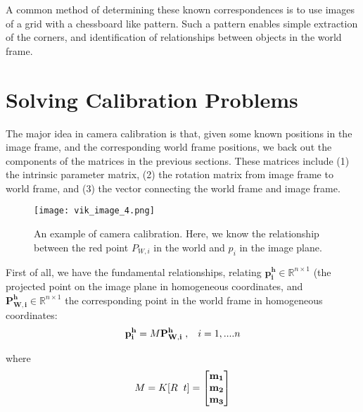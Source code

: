 \documentclass[]{article}
\begin{document}
A common method of determining these known correspondences is to use images of a grid with a chessboard like pattern. Such a pattern enables simple extraction of the corners, and identification of relationships between objects in the world frame.


\section{Solving Calibration Problems}

The major idea in camera calibration is that, given some known positions in the image frame, and the corresponding world frame positions, we back out the components of the matrices in the previous sections. These matrices include (1) the intrinsic parameter matrix, (2) the rotation matrix from image frame to world frame, and (3) the vector connecting the world frame and image frame.\\

\begin{figure}[H]
\texttt{[image: vik\_image\_4.png]}
\centering
\caption{An example of camera calibration. Here, we know the relationship between the red point $P_{W,i}$ in the world and $p_i$ in the image plane.}
\label{fig:calibration}
\end{figure}

First of all, we have the fundamental relationships, relating $\mathbf{p_i^h} \in \mathbb{R}^{n \times 1}$ (the projected point on the image plane in homogeneous coordinates, and $\mathbf{P_{W,i}^h} \in \mathbb{R}^{n \times 1}$ the corresponding point in the world frame in homogeneous coordinates:
\begin{equation}
    \mathbf{p_i^h} = M \mathbf{P_{W,i}^{h}}\hspace{1mm}, \hspace{3mm}i = 1,....n
\end{equation}

where
\begin{equation}
    M = K [R \hspace{2mm} t]=
\begin{bmatrix}
    \mathbf{m_1} \\
    \mathbf{m_2} \\
    \mathbf{m_3}
\end{bmatrix}
\end{equation}
\end{document}
